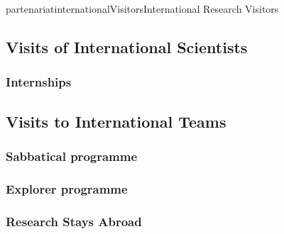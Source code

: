 \documentclass{ra2018}
\begin{document}
\begin{module}{partenariat}{internationalVisitors}{International Research Visitors}

\subsection{Visits of International Scientists}

   \subsubsection{Internships}




\subsection{Visits to International Teams}
   \subsubsection{Sabbatical programme}




   \subsubsection{Explorer programme}




   \subsubsection{Research Stays Abroad}






\end{module}


\end{document}
